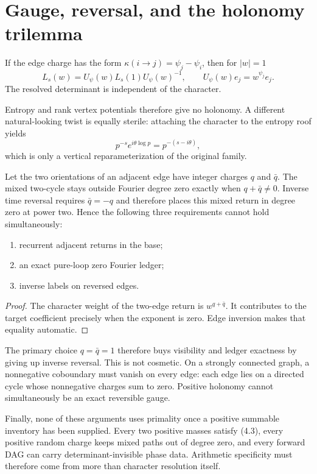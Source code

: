 \section{Gauge, reversal, and the holonomy trilemma}

\begin{proposition}
If the edge charge has the form
$\kappa(i\to j)=\psi_j-\psi_i$, then for $|w|=1$
\[
 L_s(w)=U_\psi(w)L_s(1)U_\psi(w)^{-1},\qquad
 U_\psi(w)e_j=w^{\psi_j}e_j.                           \tag{5.1}
\]
The resolved determinant is independent of the character.
\end{proposition}
Entropy and rank vertex potentials therefore give no holonomy.  A different
natural-looking twist is equally sterile: attaching the character to the
entropy roof yields
\[
 p^{-s}e^{i\theta\log p}=p^{-(s-i\theta)},              \tag{5.2}
\]
which is only a vertical reparameterization of the original family.

\begin{theorem}
\label{thm:trilemma}
Let the two orientations of an adjacent edge have integer charges $q$ and
$\bar q$.  The mixed two-cycle stays outside Fourier degree zero exactly when
$q+\bar q\ne0$.  Inverse time reversal requires $\bar q=-q$ and therefore
places this mixed return in degree zero at power two.  Hence the following
three requirements cannot hold simultaneously:
\begin{enumerate}
 \item recurrent adjacent returns in the base;
 \item an exact pure-loop zero Fourier ledger;
 \item inverse labels on reversed edges.
\end{enumerate}
\end{theorem}
\begin{proof}
The character weight of the two-edge return is $w^{q+\bar q}$.  It contributes
to the target coefficient precisely when the exponent is zero.  Edge
inversion makes that equality automatic.
\end{proof}

The primary choice $q=\bar q=1$ therefore buys visibility and ledger
exactness by giving up inverse reversal.  This is not cosmetic.  On a
strongly connected graph, a nonnegative coboundary must vanish on every edge:
each edge lies on a directed cycle whose nonnegative charges sum to zero.
Positive holonomy cannot simultaneously be an exact reversible gauge.

Finally, none of these arguments uses primality once a positive summable
inventory has been supplied.  Every two positive masses satisfy (4.3), every
positive random charge keeps mixed paths out of degree zero, and every
forward DAG can carry determinant-invisible phase data.  Arithmetic
specificity must therefore come from more than character resolution itself.
